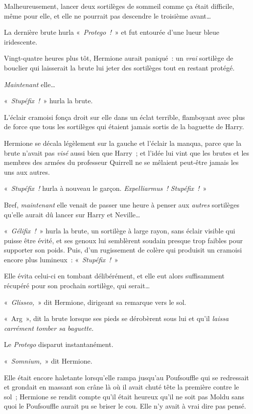 Malheureusement, lancer deux sortilèges de sommeil comme ça était difficile, même pour elle, et elle ne pourrait pas descendre le troisième avant…

La dernière brute hurla «~\emph{Protego~!}~» et fut entourée d'une lueur bleue iridescente.

Vingt-quatre heures plus tôt, Hermione aurait paniqué~: un \emph{vrai} sortilège de bouclier qui laisserait la brute lui jeter des sortilèges tout en restant protégé.

\emph{Maintenant} elle…

«~\emph{Stupéfix~!}~» hurla la brute.

L'éclair cramoisi fonça droit sur elle dans un éclat terrible, flamboyant avec plus de force que tous les sortilèges qui étaient jamais sortis de la baguette de Harry.

Hermione se décala légèlement sur la gauche et l'éclair la manqua, parce que la brute n’avait pas \emph{visé} aussi bien que Harry~; et l'idée lui vint que les brutes et les membres des armées du professeur Quirrell ne se mêlaient peut-être jamais les uns aux autres.

«~\emph{Stupéfix~!} hurla à nouveau le garçon. \emph{Expelliarmus~! Stupéfix~!}~»

Bref, \emph{maintenant} elle venait de passer une heure à penser aux \emph{autres} sortilèges qu'elle aurait dû lancer sur Harry et Neville…

«~\emph{Gélifix~!}~» hurla la brute, un sortilège à large rayon, sans éclair visible qui puisse être évité, et ses genoux lui semblèrent soudain presque trop faibles pour supporter son poids. Puis, d'un rugissement de colère qui produisit un cramoisi encore plus lumineux~: «~\emph{Stupéfix~!}~»

Elle évita celui-ci en tombant délibérément, et elle eut alors suffisamment récupéré pour son prochain sortilège, qui serait…

«~\emph{Glisseo,}~» dit Hermione, dirigeant sa remarque vers le sol.

«~Arg~», dit la brute lorsque ses pieds se dérobèrent sous lui et qu'il \emph{laissa carrément tomber sa baguette.}

Le \emph{Protego} disparut instantanément.

«~\emph{Somnium,}~» dit Hermione.

Elle était encore haletante lorsqu'elle rampa jusqu'au Poufsouffle qui se redressait et grondait en massant son crâne là où il avait chuté tête la première contre le sol~; Hermione se rendit compte qu'il était heureux qu'il ne soit pas Moldu sans quoi le Poufsouffle aurait pu se briser le cou. Elle n'y avait à vrai dire pas pensé.

